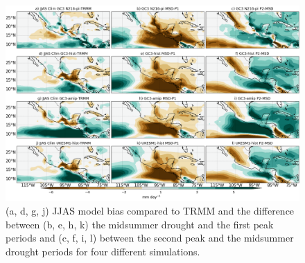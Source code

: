 



\begin{figure}[t!]
\includegraphics[width=\linewidth]{figures/fig2obs_prmodels3.png}
\caption{ (a, d, g, j) JJAS model bias compared to TRMM and the difference between  (b, e, h, k)  the midsummer drought and the first peak periods and (c, f, i, l)  between the second peak and the midsummer drought periods for four different simulations.}
\label{fig:eof2}
\end{figure}


